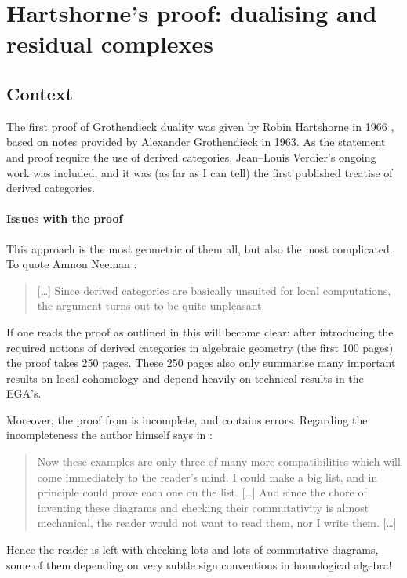 \documentclass[10pt,a4paper]{article}
\begin{document}
\section{Hartshorne's proof: dualising and residual complexes}
\label{section:hartshorne}
\subsection{Context}
\label{subsection:context}
The first proof of Grothendieck duality was given by Robin Hartshorne in 1966 \cite{hartshorne-residues-and-duality}, based on notes provided by Alexander Grothendieck in 1963. As the statement and proof require the use of derived categories, Jean--Louis Verdier's ongoing work was included, and it was (as far as I can tell) the first published treatise of derived categories.

\paragraph{Issues with the proof}
This approach is the most geometric of them all, but also the most complicated. To quote Amnon Neeman \cite{neeman-grothendieck-duality-bousfield-brown}:
\begin{quote}
  [\ldots] Since derived categories are basically unsuited for local computations, the argument turns out to be quite unpleasant.
\end{quote}
If one reads the proof as outlined in \cite{hartshorne-residues-and-duality} this will become clear: after introducing the required notions of derived categories in algebraic geometry (the first 100 pages) the proof takes 250 pages. These 250 pages also only summarise many important results on local cohomology and depend heavily on technical results in the EGA's.

Moreover, the proof from \cite{hartshorne-residues-and-duality} is incomplete, and contains errors. Regarding the incompleteness the author himself says in \cite[\S II.5]{hartshorne-residues-and-duality}:
\begin{quote}
  Now these examples are only three of many more compatibilities which will come immediately to the reader's mind. I could make a big list, and in principle could prove each one on the list. [\ldots] And since the chore of inventing these diagrams and checking their commutativity is almost mechanical, the reader would not want to read them, nor I write them. [\ldots]
\end{quote}
Hence the reader is left with checking lots and lots of commutative diagrams, some of them depending on very subtle sign conventions in homological algebra!
\end{document}
